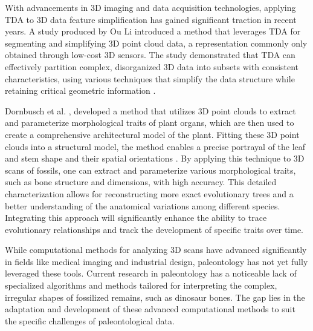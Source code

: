 \documentclass[12pt]{article}
\begin{document}

With advancements in 3D imaging and data acquisition technologies, applying TDA 
to 3D data feature simplification has gained significant
traction in recent years. A study produced by Ou Li \citep{li2021} introduced a 
method that leverages TDA for segmenting and simplifying 3D point cloud data, a
representation commonly only obtained through low-cost 3D sensors. 
The study demonstrated that TDA can effectively partition complex, disorganized 
3D data into subsets with consistent characteristics, using various techniques 
that simplify the data structure while retaining critical geometric information
\citep{li2021}.

Dornbusch et al. \cite{dornbusch2007}, developed a method that utilizes 3D point 
clouds to extract and parameterize morphological traits of plant organs, which 
are then used to create a comprehensive architectural model of the plant. Fitting 
these 3D point clouds into a structural model, the method enables a precise 
portrayal of the leaf and stem shape and their spatial orientations \citep{dornbusch2007}. 
By applying this technique to 3D scans of fossils, one can extract and parameterize 
various morphological traits, such as bone structure and dimensions, with high 
accuracy. This detailed characterization allows for reconstructing more exact
evolutionary trees and a better understanding of the anatomical variations among
different species. Integrating this approach will significantly enhance the
ability to trace evolutionary relationships and track the development of
specific traits over time. 

While computational methods for analyzing 3D scans have advanced significantly
in fields like medical imaging and industrial design, paleontology has not yet
fully leveraged these tools. Current research in paleontology has a noticeable lack of
specialized algorithms and methods tailored for interpreting the complex,
irregular shapes of fossilized remains, such as dinosaur bones. The gap lies in
the adaptation and development of these advanced computational methods to suit
the specific challenges of paleontological data.
\end{document}
